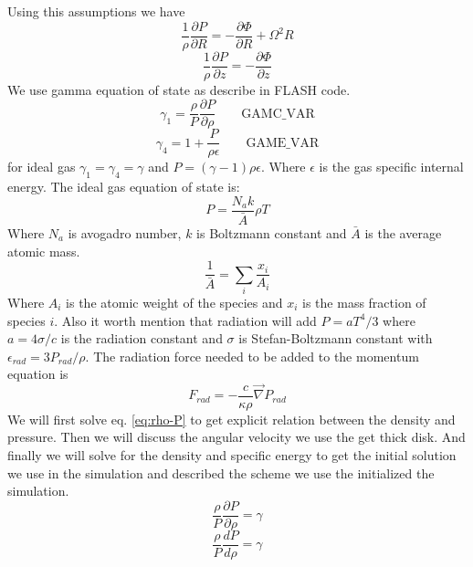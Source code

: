 \documentclass[12pt, a4paper]{article}
\begin{document}
Using this assumptions we have
\begin{equation}
    \frac{1}{\rho}\frac{\partial P}{\partial R} = -\frac{\partial \Phi}{\partial R} + \Omega^2 R
\end{equation}
\begin{equation}
    \frac{1}{\rho}\frac{\partial P}{\partial z} = -\frac{\partial \Phi}{\partial z}
\end{equation}
We use gamma equation of state as describe in FLASH code.
\begin{equation}\label{eq:rho-P}
    \gamma_1=\frac{\rho}{P}\frac{\partial P}{\partial \rho} \qquad \mathrm{GAMC\_VAR}
\end{equation}
\begin{equation}\label{eq:gamma_4}
    \gamma_4=1+\frac{P}{\rho\epsilon} \qquad \mathrm{GAME\_VAR}
\end{equation}
for ideal gas $\gamma_1=\gamma_4=\gamma$ and $P=(\gamma-1)\rho\epsilon$.
Where $\epsilon$ is the gas specific internal energy.
The ideal gas equation of state is:
\begin{equation}\label{eq:P-T}
    P=\frac{N_a k}{\bar{A}}\rho T
\end{equation}
Where $N_a$ is avogadro number, $k$ is Boltzmann constant and $\bar A$ is the average atomic mass.
\begin{equation}
    \frac{1}{\bar{A}} = \sum_i\frac{x_i}{A_i} 
\end{equation}
Where $A_i$ is the atomic weight of the species and $x_i$ is the mass fraction of species $i$.
Also it worth mention that radiation will add $P=aT^4/3$ where $a=4\sigma/c$ is the radiation constant and $\sigma$ is Stefan-Boltzmann constant with $\epsilon_{rad}=3P_{rad}/\rho$. The radiation force needed to be added to the momentum equation is 
\begin{equation}
    F_{rad}=-\frac{c}{\kappa\rho}\vec\nabla P_{rad}
\end{equation}
We will first solve eq. \ref{eq:rho-P} to get explicit relation between the density and pressure.
Then we will discuss the angular velocity we use the get thick disk.
And finally we will solve for the density and specific energy to get the initial solution we use in the simulation and described the scheme we use the initialized the simulation.
\begin{equation}
    \frac{\rho}{P}\frac{\partial P}{\partial \rho} = \gamma
\end{equation}
\begin{equation}
    \frac{\rho}{P}\frac{d P}{d \rho} = \gamma
\end{equation}
\end{document}
